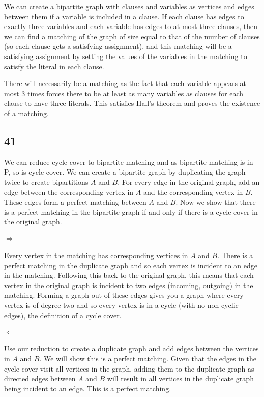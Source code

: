 \documentclass[11pt]{article}
\begin{document}
We can create a bipartite graph with clauses and variables as vertices and edges between them if a variable is included in a clause. If each clause has edges to exactly three variables and each variable has edges to at most three clauses, then we can find a matching of the graph of size equal to that of the number of clauses (so each clause gets a satisfying assignment), and this matching will be a satisfying assignment by setting the values of the variables in the matching to satisfy the literal in each clause.

There will necessarily be a matching as the fact that each variable appears at most 3 times forces there to be at least as many variables as clauses for each clause to have three literals. This satisfies Hall's theorem and proves the existence of a matching.

\subsection{41}

We can reduce cycle cover to bipartite matching and as bipartite matching is in P, so is cycle cover. We can create a bipartite graph by duplicating the graph twice to create bipartitions $A$ and $B$. For every edge in the original graph, add an edge between the corresponding vertex in $A$ and the corresponding vertex in $B$. These edges form a perfect matching between $A$ and $B$. Now we show that there is a perfect matching in the bipartite graph if and only if there is a cycle cover in the original graph.

\paragraph{$\Rightarrow$} Every vertex in the matching has corresponding vertices in $A$ and $B$. There is a perfect matching in the duplicate graph and so each vertex is incident to an edge in the matching. Following this back to the original graph, this means that each vertex in the original graph is incident to two edges (incoming, outgoing) in the matching. Forming a graph out of these edges gives you a graph where every vertex is of degree two and so every vertex is in a cycle (with no non-cyclic edges), the definition of a cycle cover.

\paragraph{$\Leftarrow$} Use our reduction to create a duplicate graph and add edges between the vertices in $A$ and $B$. We will show this is a perfect matching. Given that the edges in the cycle cover visit all vertices in the graph, adding them to the duplicate graph as directed edges between $A$ and $B$ will result in all vertices in the duplicate graph being incident to an edge. This is a perfect matching.
\end{document}
